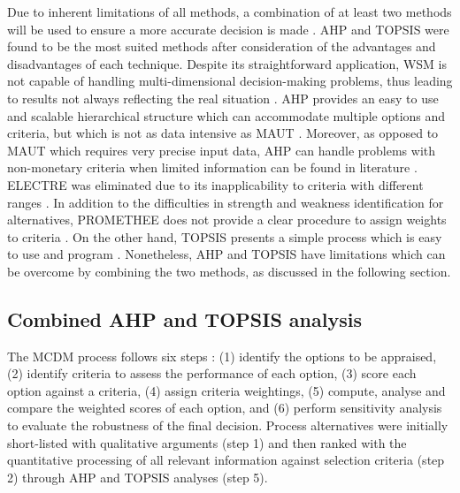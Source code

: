Due to inherent limitations of all methods, a combination of at least two methods will be used to ensure a more accurate decision is made \cite{greco_multiple_2016}. AHP and TOPSIS were found to be the most suited methods after consideration of the advantages and disadvantages of each technique. Despite its straightforward application, WSM is not capable of handling multi-dimensional decision-making problems, thus leading to results not always reflecting the real situation \cite{pohekar_application_2004}. AHP provides an easy to use and scalable hierarchical structure which can accommodate multiple options and criteria, but which is not as data intensive as MAUT \cite{velasquez_analysis_2013}. Moreover, as opposed to MAUT which requires very precise input data, AHP can handle problems with non-monetary criteria when limited information can be found in literature \cite{great_britain_multi-criteria_2009}. ELECTRE was eliminated due to its inapplicability to criteria with different ranges \cite{greco_multiple_2016}. In addition to the difficulties in strength and weakness identification for alternatives, PROMETHEE does not provide a clear procedure to assign weights to criteria \cite{velasquez_analysis_2013}. On the other hand, TOPSIS presents a simple process which is easy to use and program \cite{velasquez_analysis_2013}. Nonetheless, AHP and TOPSIS have limitations which can be overcome by combining the two methods, as discussed in the following section.


\subsection{Combined AHP and TOPSIS analysis} %

The MCDM process follows six steps \cite{great_britain_multi-criteria_2009}: (1) identify the options to be appraised, (2) identify criteria to assess the performance of each option, (3) score each option against a criteria, (4) assign criteria weightings, (5) compute, analyse and compare the weighted scores of each option, and (6) perform sensitivity analysis to evaluate the robustness of the final decision.
Process alternatives were initially short-listed with qualitative arguments (step 1) and then ranked with the quantitative processing of all relevant information against selection criteria (step 2) through AHP and TOPSIS analyses (step 5). 

